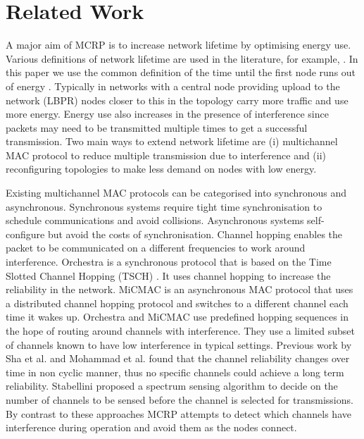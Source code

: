 \section{Related Work}
\label{RelatedWork}

 A major aim of MCRP is to increase network lifetime by optimising energy use. Various definitions of network lifetime are used in the literature, for example, .
In this paper we use the common definition of the time until the first node runs out of energy .  Typically in networks with a central node providing upload to the network (LBPR) nodes closer to this in the topology carry more traffic and use more energy.  Energy use also increases in the presence of interference since packets may need to be transmitted multiple times to get a successful transmission. Two main ways to extend network lifetime are (i) multichannel MAC protocol to reduce multiple transmission due to interference and (ii) reconfiguring topologies to make less demand on nodes with low energy.

Existing multichannel MAC protocols can be categorised into synchronous and asynchronous. Synchronous systems require tight time synchronisation to schedule communications and avoid collisions. Asynchronous systems self-configure but avoid the costs of synchronisation.
Channel hopping enables the packet to be communicated on a different frequencies to work around interference.  Orchestra \cite{orchestra} is a synchronous protocol that is based on the Time Slotted Channel Hopping (TSCH) \cite{tsch}. It uses channel hopping to increase the reliability in the network.  MiCMAC \cite{micmac} is an asynchronous MAC protocol that uses a distributed channel hopping protocol and switches to a different channel each time it wakes up.  Orchestra and MiCMAC use predefined hopping sequences in the hope of routing around channels with interference.  They use a limited subset of channels known to have low interference in typical settings. Previous work by Sha et al. \cite{homearea} and Mohammad et al. \cite{oppcast} found that the channel reliability changes over time in non cyclic manner, thus no specific channels could achieve a long term reliability. Stabellini \cite{energyluca} proposed a spectrum sensing algorithm to decide on the number of channels to be sensed before the channel is selected for transmissions.  By contrast to these approaches MCRP attempts to detect which channels have interference during operation and avoid them as the nodes connect.

